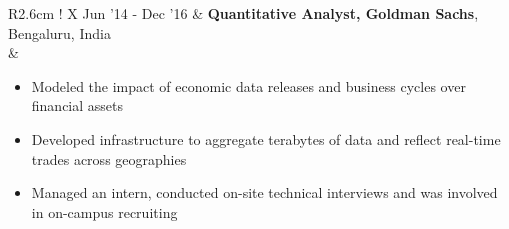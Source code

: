 \documentclass[8pt,a4paper,English]{article}
\newcommand{\lv}{\color{table-border}\vrule}
\begin{document}
\begin{tabularx}{\textwidth}{ R{2.6cm} !{\lv} X }
  Jun '14 - Dec '16 & \textbf{Quantitative Analyst, Goldman Sachs}, Bengaluru, India \\
						& \begin{minipage}[t]{0.8\textwidth}
							\begin{itemize}[label={--},leftmargin=*]
							\setlength\itemsep{-10pt}
								\item Modeled the impact of economic data releases and business cycles over financial assets \\
								\item Developed infrastructure to aggregate terabytes of data and reflect real-time trades across geographies \\
								\item Managed an intern, conducted on-site technical interviews and was involved in on-campus recruiting \\[-8pt]
							\end{itemize} 
							\end{minipage} \\

\end{tabularx}
\end{document}
